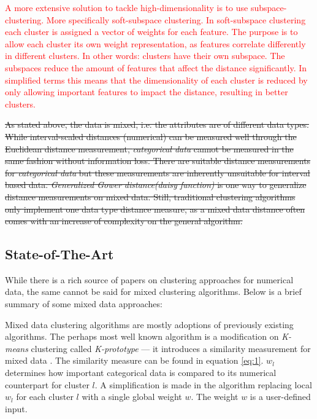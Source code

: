 \documentclass[a4paper,11pt]{article}
\begin{document}
\textcolor{red}{
A more extensive solution to tackle high-dimensionality is to use subspace-clustering. More specifically soft-subspace clustering. In soft-subspace clustering each cluster is assigned a vector of weights for each feature. The purpose is to allow each cluster its own weight representation, as features correlate differently in different clusters. In other words: clusters have their own subspace. The subspaces reduce the amount of features that affect the distance significantly. In simplified terms this means that the dimensionality of each cluster is reduced by only allowing important features to impact the distance, resulting in better clusters.
}

\st{
As stated above, the data is mixed, i.e. the attributes are of different
data types. While interval-scaled distances (numerical) can be measured well through
the Euclidean distance measurement, \textit{categorical data} cannot be measured in the same fashion without information loss.  There are suitable distance measurements for \textit{categorical data} but these measurements are inherently unsuitable for interval based data. \textit{Generalized Gower distance(daisy function)} is one way to generalize distance measurements on mixed data. Still, traditional clustering algorithms only implement one data type distance measure, as a mixed data distance often comes with an increase of complexity on the general algorithm.
}




\subsection{State-of-The-Art}
While there is a rich source of papers on clustering approaches for numerical data, the same cannot be said for mixed clustering algorithms. Below is a brief summary of some mixed data approaches:

Mixed data clustering algorithms are mostly adoptions of previously existing algorithms. The perhaps most well known algorithm is a modification on \textit{K-means} clustering called \textit{K-prototype} \cite{Huang97clusteringlarge} --- it introduces a similarity measurement for mixed data . The similarity measure can be found in equation \ref{eq:1}. $w_l$ determines how important categorical data is compared to its numerical counterpart for cluster $l$. A simplification is made in the algorithm replacing local $w_l$ for each cluster $l$ with a single global weight $w$. The weight $w$ is a user-defined input.
\end{document}
